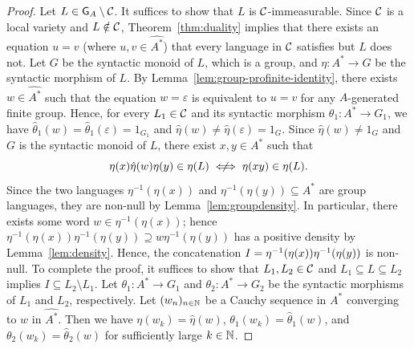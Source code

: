 \begin{proof}
  Let \(L \in \mathsf{G}_A \setminus {\cal C}\).
  It suffices to show that \(L\) is \({\cal C}\)-immeasurable.
  Since \({\cal C}\) is a local variety and \(L \notin {\cal C}\), Theorem~\ref{thm:duality} implies
  that there exists an equation \(u = v\) (where \(u, v \in \widehat{A^*}\)) that every language in \({\cal C}\) satisfies but \(L\) does not.
  Let \(G\) be the syntactic monoid of \(L\), which is a group, and \(\eta\colon A^* \to G\) be the syntactic morphism of \(L\).
  By Lemma~\ref{lem:group-profinite-identity},
  there exists \(w \in \widehat{A^*}\) such that the equation \(w = \varepsilon\) is equivalent to \(u = v\) for any \(A\)-generated finite group.
  Hence, for every \(L_1 \in {\cal C}\) and its syntactic morphism \(\theta_1\colon A^* \to G_1\),
  we have \(\hat{\theta}_1(w) = \hat{\theta}_1(\varepsilon) = 1_{G_1}\) and \(\hat{\eta}(w) \neq \hat{\eta}(\varepsilon) = 1_G\).
  Since \(\hat{\eta}(w) \neq 1_G\) and \(G\) is the syntactic monoid of \(L\), there exist \(x, y \in A^*\)
  such that
  \begin{equation}
    \eta(x) \hat{\eta}(w) \eta(y) \in \eta(L) \centernot\iff \eta(x y) \in \eta(L). \label{eq:ebc45b27}
  \end{equation}
  Since the two languages \(\eta^{-1}(\eta(x))\) and \(\eta^{-1}(\eta(y)) \subseteq A^*\) are group languages,
  they are non-null by Lemma~\ref{lem:groupdensity}.
 In particular, there exists some word \(w \in \eta^{-1}(\eta(x))\); hence \(\eta^{-1}(\eta(x)) \eta^{-1}(\eta(y)) \supseteq w \eta^{-1}(\eta(y))\) has a positive density by Lemma~\ref{lem:density}.
  Hence, the concatenation \(I = \eta^{-1}(\eta(x)) \eta^{-1}(\eta(y))\) is non-null.
  To complete the proof, it suffices to show that \(L_1, L_2 \in {\cal C}\) and \(L_1 \subseteq L \subseteq L_2\) implies \(I \subseteq L_2 \setminus L_1\).
  Let \(\theta_1\colon A^* \to G_1\) and \(\theta_2\colon A^* \to G_2\) be the syntactic morphisms of \(L_1\) and \(L_2\), respectively.
  Let \((w_n)_{n \in \mathbb{N}}\) be a Cauchy sequence in \(A^*\) converging to \(w\) in \(\widehat{A^*}\).
  Then we have \(\eta(w_k) = \hat{\eta}(w)\), \(\theta_1(w_k) = \hat{\theta}_1(w)\), and \(\theta_2(w_k) = \hat{\theta}_2(w)\) for sufficiently large \(k \in \mathbb{N}\).


\end{proof}
